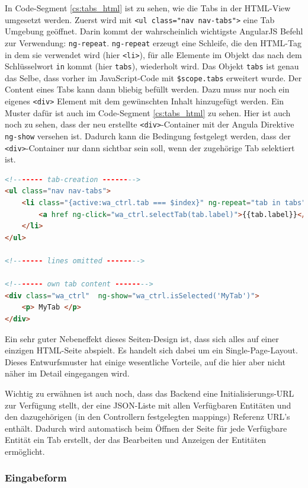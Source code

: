 In Code-Segment \ref{cs:tabs_html} ist zu sehen, wie die Tabs in der HTML-View umgesetzt werden. Zuerst wird mit \verb|<ul class="nav nav-tabs">| eine Tab Umgebung geöffnet. Darin kommt der wahrscheinlich wichtigste AngularJS Befehl zur Verwendung: \verb|ng-repeat|. \verb|ng-repeat| erzeugt eine Schleife, die den HTML-Tag in dem sie verwendet wird (hier \verb|<li>|), für alle Elemente im Objekt das nach dem Schlüsselwort \verb|in| kommt (hier \verb|tabs|), wiederholt wird. Das Objekt \verb|tabs| ist genau das Selbe, dass vorher im JavaScript-Code mit \verb|$scope.tabs| erweitert wurde. Der Content eines Tabs kann dann bliebig befüllt werden. Dazu muss nur noch ein eigenes \verb|<div>| Element mit dem gewünschten Inhalt hinzugefügt werden. Ein Muster dafür ist auch im Code-Segment \ref{cs:tabs_html} zu sehen. Hier ist auch noch zu sehen, dass der neu erstellte \verb|<div>|-Container mit der Angula Direktive \verb|ng-show| versehen ist. Dadurch kann die Bedingung festgelegt werden, dass der \verb|<div>|-Container nur dann sichtbar sein soll, wenn der zugehörige Tab selektiert ist.

\scriptsize
\begin{lstlisting}[caption=Tab Erstellung in index.html, label=cs:tabs_html, language=HTML]
<!------- tab-creation -------->
<ul class="nav nav-tabs">
	<li class="{active:wa_ctrl.tab === $index}" ng-repeat="tab in tabs">
		<a href ng-click="wa_ctrl.selectTab(tab.label)">{{tab.label}}</a></li>
	</li>
</ul>

<!------- lines omitted -------->

<!------- own tab content -------->
<div class="wa_ctrl"  ng-show="wa_ctrl.isSelected('MyTab')">
	<p> MyTab </p>
</div>
\end{lstlisting}
\normalsize

Ein sehr guter Nebeneffekt dieses Seiten-Design ist, dass sich alles auf einer einzigen HTML-Seite abspielt. Es handelt sich dabei um ein Single-Page-Layout. Dieses Entwurfsmuster hat einige wesentliche Vorteile, auf die hier aber nicht näher im Detail eingegangen wird. 

Wichtig zu erwähnen ist auch noch, dass das Backend eine Initialisierungs-URL zur Verfügung stellt, der eine JSON-Liste mit allen Verfügbaren Entitäten und den dazugehörigen (in den Controllern festgelegten mappings) Referenz URL's enthält. Dadurch wird automatisch beim Öffnen der Seite für jede Verfügbare Entität ein Tab erstellt, der das Bearbeiten und Anzeigen der Entitäten ermöglicht.

\subsubsection{Eingabeform}

